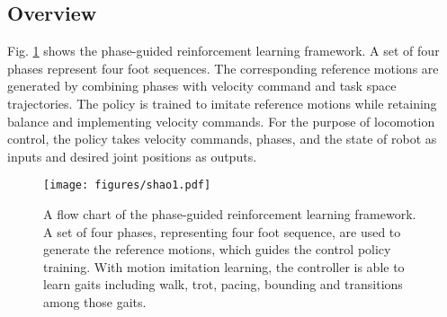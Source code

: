 \documentclass[letterpaper, 10 pt, journal, twoside]{IEEEtran} %
\begin{document}
\subsection{Overview}
Fig. \ref{method_1} shows the phase-guided reinforcement learning framework. A set of four phases represent four foot sequences. The corresponding reference motions are generated by combining phases with velocity command and task space trajectories. The policy is trained to imitate reference motions while retaining balance and implementing velocity commands. For the purpose of locomotion control, the policy takes velocity commands, phases, and the state of robot as inputs and desired joint positions as outputs. 
\begin{figure}[!t]
	\centering
	\texttt{[image: figures/shao1.pdf]}
	\caption{A flow chart of the phase-guided reinforcement learning framework. A set of four phases, representing four foot sequence, are used to generate the reference motions, which guides the control policy training. With motion imitation learning, the controller is able to learn gaits including walk, trot, pacing, bounding and transitions among those gaits.}
	\label{method_1}
\end{figure}
\end{document}
